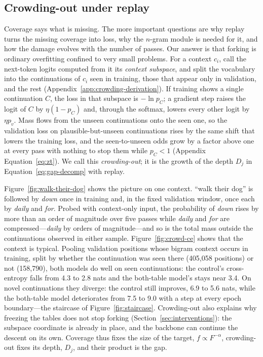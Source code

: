 \subsection{Crowding-out under replay}
\label{sec:sharpening}
Coverage says what is missing. The more important questions are why replay turns the missing coverage into loss, why the $n$-gram module is needed for it, and how the damage evolves with the number of passes. Our answer is that forking is ordinary overfitting confined to very small problems. For a context $c_i$, call the next-token logits computed from it its \emph{context subspace}, and split the vocabulary into the continuations of $c_i$ seen in training, those that appear only in validation, and the rest (Appendix~\ref{app:crowding-derivation}). If training shows a single continuation $C$, the loss in that subspace is $-\ln p_C$; a gradient step raises the logit of $C$ by $\eta(1-p_C)$ and, through the softmax, lowers every other logit by $\eta p_v$. Mass flows from the unseen continuations onto the seen one, so the validation loss on plausible-but-unseen continuations rises by the same shift that lowers the training loss, and the seen-to-unseen odds grow by a factor above one at every pass with nothing to stop them while $p_C<1$ (Appendix Equation~\eqref{eq:zt}). We call this \emph{crowding-out}; it is the growth of the depth $D_j$ in Equation~\eqref{eq:gap-decomp} with replay.

Figure~\ref{fig:walk-their-dog} shows the picture on one context. ``walk their dog'' is followed by \emph{down} once in training and, in the fixed validation window, once each by \emph{daily} and \emph{for}. Probed with context-only input, the probability of \emph{down} rises by more than an order of magnitude over five passes while \emph{daily} and \emph{for} are compressed---\emph{daily} by orders of magnitude---and so is the total mass outside the continuations observed in either sample. Figure~\ref{fig:crowd-ce} shows that the context is typical. Pooling validation positions whose bigram context occurs in training, split by whether the continuation was seen there (405{,}058 positions) or not (158{,}790), both models do well on seen continuations: the control's cross-entropy falls from 4.3 to 2.8 nats and the both-table model's stays near 3.4. On novel continuations they diverge: the control still improves, 6.9 to 5.6 nats, while the both-table model deteriorates from 7.5 to 9.0 with a step at every epoch boundary---the staircase of Figure~\ref{fig:staircase}. Crowding-out also explains why freezing the tables does not stop forking (Section~\ref{sec:interventions}): the subspace coordinate is already in place, and the backbone can continue the descent on its own. Coverage thus fixes the size of the target, $f\propto F^{-\alpha}$, crowding-out fixes its depth, $D_j$, and their product is the gap.

